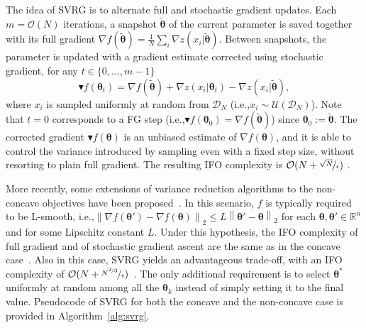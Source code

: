 \documentclass{article}
\makeatletter
\theoremstyle{remark}
\theoremstyle{definition}
\DeclareRobustCommand{\eg}{e.g.,\@\xspace}
\DeclareRobustCommand{\ie}{i.e.,\@\xspace}
\newcommand{\realspace}{\mathbb R}      %
\newcommand{\norm}[2][\infty]{\left\|#2\right\|_{#1}}
\newcommand{\vtheta}{\boldsymbol{\theta}}
\newcommand{\wt}[1]{\widetilde{#1}}
\makeatother
\begin{document}
The idea of SVRG is to alternate full and stochastic gradient updates. 
Each $m = \mathcal{O}(N)$ iterations, a snapshot $\widetilde{\vtheta}$ of the current parameter is saved together with its full gradient $\nabla f(\widetilde{\vtheta}) = \frac{1}{N} \sum_i \nabla z(x_i|\widetilde{\vtheta})$.
Between snapshots, the parameter is updated with a gradient estimate corrected using stochastic gradient, for any $t \in \{0,\ldots,m-1\}$
\begin{equation}\label{E:svrg.gradient.correction}
        \blacktriangledown f(\vtheta_{t}) = \nabla f(\tilde{\vtheta}) + \nabla z(x_i | \vtheta_t) - \nabla z(x_i | \tilde{\vtheta}),
\end{equation} 
where $x_i$ is sampled uniformly at random from $\mathcal{D}_N$ (\ie $x_i \sim \mathcal{U}(\mathcal{D}_N)$).
Note that $t=0$ corresponds to a FG step (\ie $\blacktriangledown f(\vtheta_0) = \nabla f(\wt{\vtheta})$) since $\vtheta_0 := \wt{\vtheta}$.
The corrected gradient $\blacktriangledown f(\vtheta)$ is an unbiased estimate of $\nabla f(\vtheta)$, and it is able to control the variance introduced by sampling even with a fixed step size, without resorting to plain full gradient. The resulting IFO complexity is $\mathcal{O}(N+\nicefrac{\sqrt{N}}{\epsilon})$ \cite{reddi2016stochastic}.

More recently, some extensions of variance reduction algorithms to the non-concave objectives have been proposed~\citep[\eg][]{reddi2016stochastic,allen2016variance,reddi2016stochastic,reddi2016fast}. In this scenario, $f$ is typically required to be L-smooth, \ie $\norm[2]{\nabla f(\vtheta') - \nabla f(\vtheta)} \leq L\norm[2]{\vtheta'-\vtheta}$ for each $\vtheta,\vtheta'\in\realspace^n$ and for some Lipschitz constant $L$. Under this hypothesis, the IFO complexity of full gradient  and of stochastic gradient ascent are the same as in the concave case~\citep{nesterov2013introductory,ghadimi2013stochastic}. Also in this case, SVRG yields an advantageous trade-off, with an IFO complexity of $\mathcal{O}(N + \nicefrac{N^{\nicefrac{2}{3}}}{\epsilon})$~\citep{reddi2016stochastic}. The only additional requirement is to select $\vtheta^*$ uniformly at random among all the $\vtheta_k$ instead of simply setting it to the final value. Pseudocode of SVRG for both the concave and the non-concave case is provided in Algorithm~\ref{alg:svrg}.
\end{document}
